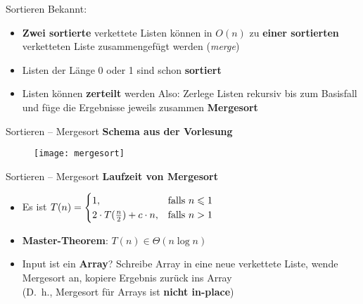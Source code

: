 \begin{frame}{Sortieren}
	Bekannt: 
	\begin{itemize}
		\item \textbf{Zwei sortierte} verkettete Listen können in $O(n)$ zu \textbf{einer sortierten} verketteten Liste zusammengefügt werden (\emph{merge})
		\pause
		\item Listen der Länge 0 oder 1 sind schon \textbf{sortiert}
		\pause
		\item Listen können \textbf{zerteilt} werden
		\pause
		\implitem Also: Zerlege Listen rekursiv bis zum Basisfall und füge die Ergebnisse jeweils zusammen \impl \textbf{Mergesort}
		\begin{algorithm}[H]
		\end{algorithm}
	\end{itemize}
\end{frame}

\begin{frame}{Sortieren – Mergesort}
	\textbf{Schema aus der Vorlesung}
	\begin{figure}[htp]
		\centering
		\texttt{[image: mergesort]}
	\end{figure}
\end{frame}


\begin{frame}{Sortieren – Mergesort}
	\textbf{Laufzeit von Mergesort}
	\pause
	\begin{itemize}
		\item Es ist $T(n) = \begin{cases}
			1, & \text{falls } n \leq 1 \\
			2 \cdot T(\fract n/2 ) + c \cdot n, & \text{falls } n > 1
		\end{cases}$
		\pause
		\item \textbf{Master-Theorem}: \quad $T(n) \in \Theta(n \log n)$
		\pause
		\item Input ist ein \textbf{Array}? \impl  Schreibe Array in eine neue verkettete Liste, wende Mergesort an, kopiere Ergebnis zurück ins Array \\
		(\impl D.~h., Mergesort für Arrays ist \textbf{nicht in-place})
	\end{itemize}
\end{frame}


